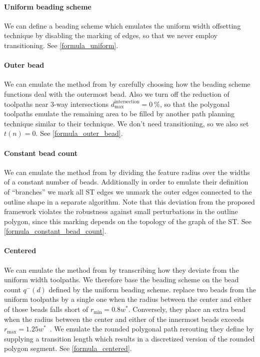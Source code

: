 \paragraph{Uniform beading scheme}
We can define a beading scheme which emulates the uniform width offsetting technique by disabling the marking of edges, so that we never employ transitioning.
See \cref{formula_uniform}.


\paragraph{Outer bead}
We can emulate the method from \citeauthor{Moesen2011} by carefully choosing how the beading scheme functions deal with the outermost bead.
Also we turn off the reduction of toolpaths near 3-way intersections $d_\text{max}^\text{intersection} = \SI{0}{\percent}$, so that the polygonal toolpaths emulate the remaining area to be filled by another path planning technique similar to their technique.
We don't need transitioning, so we also set $t(n) = 0 $.
See \cref{formula_outer_bead}.



\paragraph{Constant bead count}
We can emulate the method from \citeauthor{Ding2016a} by dividing the feature radius over the widths of a constant number of beads.
Additionally in order to emulate their definition of ``branches'' we mark all ST edges we unmark the outer edges connected to the outline shape in a separate algorithm.
Note that this deviation from the proposed framework violates the robustness against small perturbations in the outline polygon, since this marking depends on the topology of the graph of the ST.
See \cref{formula_constant_bead_count}.




\paragraph{Centered}
We can emulate the method from \citeauthor{Jin2017JMS} by transcribing how they deviate from the uniform width toolpaths.
We therefore base the beading scheme on the bead count $q^-(d)$ defined by the uniform beading scheme.
\citeauthor{Jin2017JMS} replace two beads from the uniform toolpaths by a single one when the radius between the center and either of those beads falls short of $r_\text{min} = 0.8 w^*$.
Conversely, they place an extra bead when the radius between the center and either of the innermost beads exceeds $r_\text{max} = 1.25 w^*$~\cite{Jin2017JMS}.
We emulate the rounded polygonal path rerouting they define by supplying a transition length which results in a discretized version of the rounded polygon segment.
See \cref{formula_centered}.






